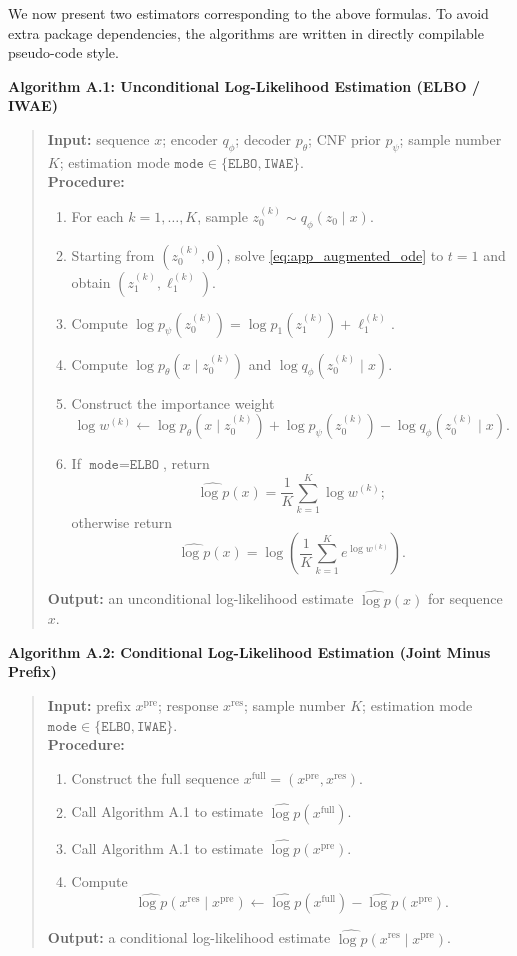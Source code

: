 We now present two estimators corresponding to the above formulas. To avoid extra package dependencies, the algorithms are written in directly compilable pseudo-code style.

\textbf{Algorithm A.1: Unconditional Log-Likelihood Estimation (ELBO / IWAE)}
\begin{quote}
\textbf{Input:} sequence $x$; encoder $q_{\phi}$; decoder $p_{\theta}$; CNF prior $p_{\psi}$; sample number $K$; estimation mode $\texttt{mode}\in\{\texttt{ELBO},\texttt{IWAE}\}$.\\
\textbf{Procedure:}
\begin{enumerate}[leftmargin=2.2em]
    \item For each $k=1,\dots,K$, sample $z_0^{(k)}\sim q_{\phi}(z_0\mid x)$.
    \item Starting from $(z_0^{(k)},0)$, solve \eqref{eq:app_augmented_ode} to $t=1$ and obtain $(z_1^{(k)},\ell_1^{(k)})$.
    \item Compute $\log p_{\psi}(z_0^{(k)})=\log p_1(z_1^{(k)})+\ell_1^{(k)}$.
    \item Compute $\log p_{\theta}(x\mid z_0^{(k)})$ and $\log q_{\phi}(z_0^{(k)}\mid x)$.
    \item Construct the importance weight
    \[
    \log w^{(k)}
    \gets
    \log p_{\theta}(x\mid z_0^{(k)})
    +\log p_{\psi}(z_0^{(k)})
    -\log q_{\phi}(z_0^{(k)}\mid x).
    \]
    \item If $\texttt{mode}=\texttt{ELBO}$, return
    \[
    \widehat{\log p}(x)=\frac{1}{K}\sum_{k=1}^{K}\log w^{(k)};
    \]
    otherwise return
    \[
    \widehat{\log p}(x)=\log\!\left(\frac{1}{K}\sum_{k=1}^{K}e^{\log w^{(k)}}\right).
    \]
\end{enumerate}
\textbf{Output:} an unconditional log-likelihood estimate $\widehat{\log p}(x)$ for sequence $x$.
\end{quote}

\textbf{Algorithm A.2: Conditional Log-Likelihood Estimation (Joint Minus Prefix)}
\begin{quote}
\textbf{Input:} prefix $x^{\mathrm{pre}}$; response $x^{\mathrm{res}}$; sample number $K$; estimation mode $\texttt{mode}\in\{\texttt{ELBO},\texttt{IWAE}\}$.\\
\textbf{Procedure:}
\begin{enumerate}[leftmargin=2.2em]
    \item Construct the full sequence $x^{\mathrm{full}}=(x^{\mathrm{pre}},x^{\mathrm{res}})$.
    \item Call Algorithm A.1 to estimate $\widehat{\log p}(x^{\mathrm{full}})$.
    \item Call Algorithm A.1 to estimate $\widehat{\log p}(x^{\mathrm{pre}})$.
    \item Compute
    \[
    \widehat{\log p}(x^{\mathrm{res}}\mid x^{\mathrm{pre}})
    \gets
    \widehat{\log p}(x^{\mathrm{full}})-\widehat{\log p}(x^{\mathrm{pre}}).
    \]
\end{enumerate}
\textbf{Output:} a conditional log-likelihood estimate $\widehat{\log p}(x^{\mathrm{res}}\mid x^{\mathrm{pre}})$.
\end{quote}

